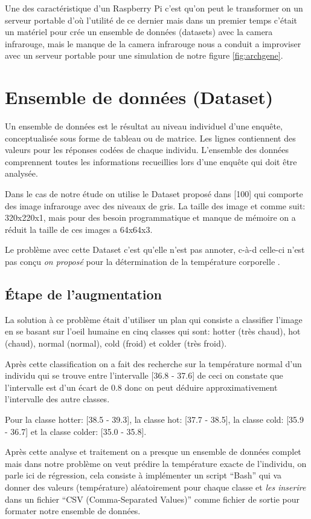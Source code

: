 \documentclass[12pt]{article}
\begin{document}
Une des caractéristique d’un Raspberry Pi c’est qu’on peut le transformer on un serveur portable d'où l’utilité de ce dernier mais dans un premier temps c’était un matériel pour crée un ensemble de données (datasets) avec la camera infrarouge, mais le manque de la camera infrarouge nous a conduit a improviser avec un serveur portable pour une simulation de notre figure \ref{fig:archgene}.

\section{Ensemble de données (Dataset)}
Un ensemble de données est le résultat au niveau individuel d’une enquête, conceptualisée sous forme de tableau ou de matrice. Les lignes contiennent des valeurs pour les réponses codées de chaque individu. L’ensemble des données comprennent toutes les informations recueillies lors d'une enquête qui doit être analysée.

Dans le cas de notre étude on utilise le Dataset proposé dans  [100] qui comporte des image infrarouge avec des niveaux de gris. La taille des image et comme suit: 320x220x1, mais pour des besoin programmatique et manque de mémoire on a réduit la taille de ces images a 64x64x3. 

Le problème avec cette Dataset c’est qu’elle n’est pas annoter, c-à-d celle-ci n’est pas conçu \textit{on proposé} pour la détermination de la température corporelle .

\subsection{\' Etape de l'augmentation}
La solution à ce problème était d’utiliser un plan qui consiste a classifier l’image en se basant sur l’oeil humaine en cinq classes qui sont: hotter (très chaud), hot (chaud), normal (normal), cold (froid) et colder (très froid).

 Après cette classification on a fait des recherche sur la température normal d’un individu qui se trouve entre l’intervalle [36.8 - 37.6] de ceci on constate que l’intervalle est d’un écart de 0.8 donc on peut déduire approximativement l’intervalle des autre classes.

Pour la classe hotter: [38.5 - 39.3], la classe hot: [37.7 - 38.5], la classe cold: [35.9 - 36.7] et la classe colder: [35.0 - 35.8]. 

Après cette analyse et traitement on a presque un ensemble de données complet mais dans notre problème on veut prédire la température exacte de l’individu, on parle ici de régression, cela consiste à implémenter un script “Bash” qui va donner des valeurs (température) aléatoirement pour chaque classe et \textit{les inserire} dans un fichier “CSV (Comma-Separated Values)” comme fichier de sortie pour formater notre ensemble de données.
\end{document}
